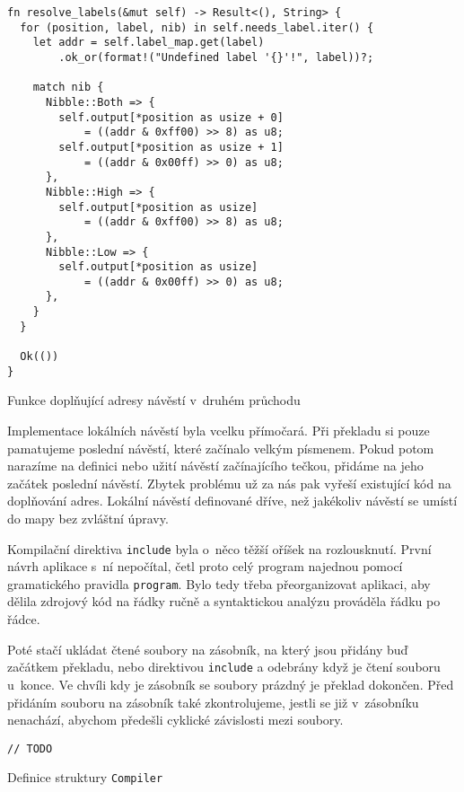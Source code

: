 \begin{listing}
\begin{verbatim}
fn resolve_labels(&mut self) -> Result<(), String> {
  for (position, label, nib) in self.needs_label.iter() {
    let addr = self.label_map.get(label)
        .ok_or(format!("Undefined label '{}'!", label))?;

    match nib {
      Nibble::Both => {
        self.output[*position as usize + 0]
            = ((addr & 0xff00) >> 8) as u8;
        self.output[*position as usize + 1]
            = ((addr & 0x00ff) >> 0) as u8;
      },
      Nibble::High => {
        self.output[*position as usize]
            = ((addr & 0xff00) >> 8) as u8;
      },
      Nibble::Low => {
        self.output[*position as usize]
            = ((addr & 0x00ff) >> 0) as u8;
      },
    }
  }

  Ok(())
}
\end{verbatim}
\caption{Funkce doplňující adresy návěstí v~druhém průchodu}
\label{fig:rust-result}
\end{listing}

Implementace lokálních návěstí byla vcelku přímočará. Při překladu si pouze pamatujeme poslední návěstí, které začínalo velkým písmenem. Pokud potom narazíme na definici nebo užití návěstí začínajícího tečkou, přidáme na jeho začátek poslední  návěstí. Zbytek problému už za nás pak vyřeší existující kód na doplňování adres. Lokální návěstí definované dříve, než jakékoliv  návěstí se umístí do mapy bez zvláštní úpravy.

Kompilační direktiva \texttt{include} byla o~něco těžší oříšek na rozlousknutí. První návrh aplikace s~ní nepočítal, četl proto celý program najednou pomocí gramatického pravidla \texttt{program}. Bylo tedy třeba přeorganizovat aplikaci, aby dělila zdrojový kód na řádky ručně a syntaktickou analýzu prováděla řádku po řádce.

Poté stačí ukládat čtené soubory na zásobník, na který jsou přidány buď začátkem překladu, nebo direktivou \texttt{include} a odebrány když je čtení souboru u~konce. Ve chvíli kdy je zásobník se soubory prázdný je překlad dokončen. Před přidáním souboru na zásobník také zkontrolujeme, jestli se již v~zásobníku nenachází, abychom předešli cyklické závislosti mezi soubory.


\begin{listing}
\begin{verbatim}
// TODO
\end{verbatim}
\caption{Definice struktury \texttt{Compiler}}
\label{fig:rust-file-stack}
\end{listing}

